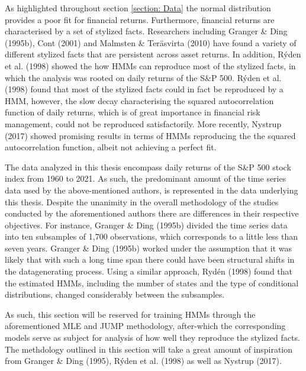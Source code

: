 As highlighted throughout section \ref{section: Data} the normal distribution provides a poor fit for financial returns. Furthermore, financial returns are characterised by a set of stylized facts. Researchers including Granger \& Ding (1995b), Cont (2001) and Malmsten \& Teräsvirta (2010) have found a variety of different stylized facts that are persistent across asset returns. In addition, Rýden et al. (1998) showed the how HMMs can reproduce most of the stylized facts, in which the analysis was rooted on daily returns of the S\&P 500. Rýden et al. (1998) found that most of the stylized facts could in fact be reproduced by a HMM, however, the slow decay characterising the  squared autocorrelation function of daily returns, which is of great importance in financial risk management, could not be reproduced satisfactorily. More recently, Nystrup (2017) showed promising results in terms of HMMs reproducing the the squared autocorrelation function, albeit not achieving a perfect fit. 

The data analyzed in this thesis encompass daily returns of the S\&P 500 stock index from 1960 to 2021. As such, the predominant amount of the time series data used by the above-mentioned authors, is represented in the data underlying this thesis. Despite the unanimity in the overall methodology of the studies conducted by the aforementioned authors there are differences in their respective objectives. For instance, Granger \& Ding (1995b) divided the time series data into ten subsamples of 1,700 observations, which corresponds to a little less than seven years. Granger \& Ding (1995b) worked under the assumption that it was likely that with such a long time span there could have been structural shifts in the datagenerating process. Using a similar approach, Rydén (1998) found that the estimated HMMs, including the number of states and the type of conditional distributions, changed considerably between the subsamples.

As such, this section will be reserved for training HMMs through the aforementioned MLE and JUMP methodology, after-which the corresponding models serve as subject for analysis of how well they reproduce the stylized facts. The methdology outlined in this section will take a great amount of inspiration from Granger \& Ding (1995), Rýden et al. (1998) as well as Nystrup (2017).

